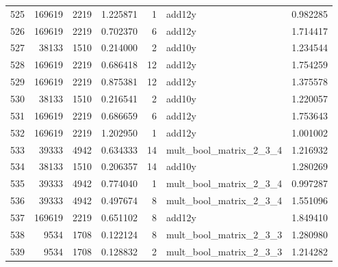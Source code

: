 \begin{tabular}{lrrrrlr}
525 & 169619 & 2219 & 1.225871 & 1 & add12y & 0.982285 \\
526 & 169619 & 2219 & 0.702370 & 6 & add12y & 1.714417 \\
527 & 38133 & 1510 & 0.214000 & 2 & add10y & 1.234544 \\
528 & 169619 & 2219 & 0.686418 & 12 & add12y & 1.754259 \\
529 & 169619 & 2219 & 0.875381 & 12 & add12y & 1.375578 \\
530 & 38133 & 1510 & 0.216541 & 2 & add10y & 1.220057 \\
531 & 169619 & 2219 & 0.686659 & 6 & add12y & 1.753643 \\
532 & 169619 & 2219 & 1.202950 & 1 & add12y & 1.001002 \\
533 & 39333 & 4942 & 0.634333 & 14 & mult_bool_matrix_2_3_4 & 1.216932 \\
534 & 38133 & 1510 & 0.206357 & 14 & add10y & 1.280269 \\
535 & 39333 & 4942 & 0.774040 & 1 & mult_bool_matrix_2_3_4 & 0.997287 \\
536 & 39333 & 4942 & 0.497674 & 8 & mult_bool_matrix_2_3_4 & 1.551096 \\
537 & 169619 & 2219 & 0.651102 & 8 & add12y & 1.849410 \\
538 & 9534 & 1708 & 0.122124 & 8 & mult_bool_matrix_2_3_3 & 1.280980 \\
539 & 9534 & 1708 & 0.128832 & 2 & mult_bool_matrix_2_3_3 & 1.214282 \\
\end{tabular}
